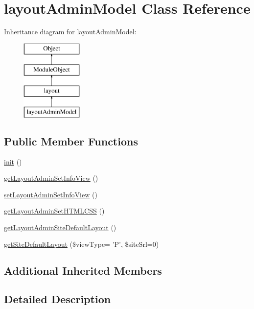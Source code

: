 \hypertarget{classlayoutAdminModel}{\section{layout\+Admin\+Model Class Reference}
\label{classlayoutAdminModel}
}
Inheritance diagram for layout\+Admin\+Model\+:\begin{figure}[H]
\begin{center}
\leavevmode
\includegraphics[height=4.000000cm]{classlayoutAdminModel}
\end{center}
\end{figure}
\subsection*{Public Member Functions}
\begin{DoxyCompactItemize}
\item 
\hyperlink{classlayoutAdminModel_aeb0c45993a600a2e3f72bd0a79c3adc7}{init} ()
\item 
\hyperlink{classlayoutAdminModel_a7171578a8c44846e96b6330378152ddd}{get\+Layout\+Admin\+Set\+Info\+View} ()
\item 
\hyperlink{classlayoutAdminModel_a5d53a19d62ff5fcbd2cc604e3d6a8e29}{set\+Layout\+Admin\+Set\+Info\+View} ()
\item 
\hyperlink{classlayoutAdminModel_a5757eaff4093fe8a359b4f3b5a6a2bff}{get\+Layout\+Admin\+Set\+H\+T\+M\+L\+C\+S\+S} ()
\item 
\hyperlink{classlayoutAdminModel_a1fb703fe8ebe3ced1f904d3a1d645532}{get\+Layout\+Admin\+Site\+Default\+Layout} ()
\item 
\hyperlink{classlayoutAdminModel_af2e53398a6068a4652567b922dfce4b1}{get\+Site\+Default\+Layout} (\$view\+Type= 'P', \$site\+Srl=0)
\end{DoxyCompactItemize}
\subsection*{Additional Inherited Members}


\subsection{Detailed Description}


